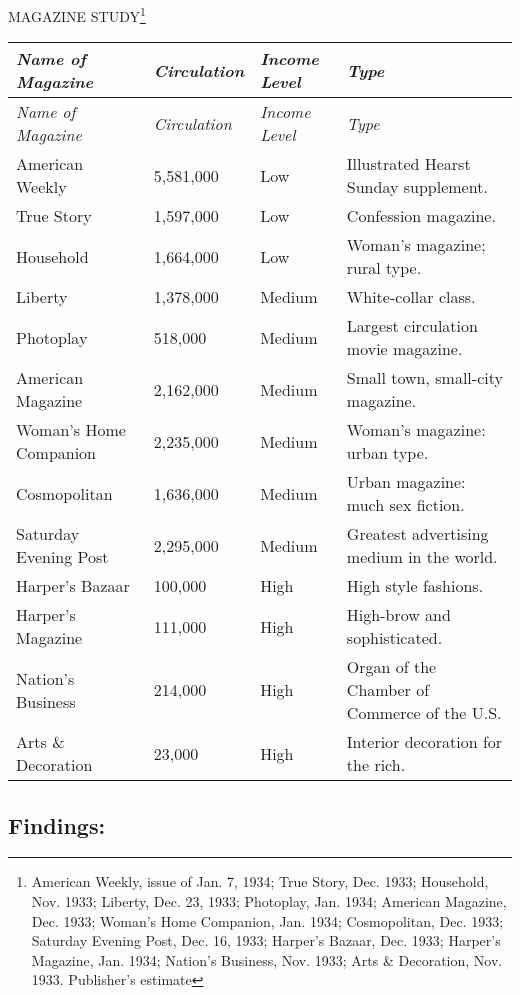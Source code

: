 \documentclass[twoside,nohyper,openany,nobib]{tufte-book}
\begin{document}
\vspace{5mm}

\begin{center}MAGAZINE STUDY\footnote{American Weekly, issue of Jan. 7, 1934; True Story, Dec. 1933;
  Household, Nov. 1933; Liberty, Dec. 23, 1933; Photoplay, Jan. 1934;
  American Magazine, Dec. 1933; Woman's Home Companion, Jan. 1934;
  Cosmopolitan, Dec. 1933; Saturday Evening Post, Dec. 16, 1933;
  Harper's Bazaar, Dec. 1933; Harper's Magazine, Jan. 1934; Nation's
  Business, Nov. 1933; Arts \& Decoration, Nov. 1933. Publisher's estimate}\end{center}
\tabulinesep=1.1mm
{\begin{longtabu} to 1.05\textwidth { X[2,l] X[1,r] X[1,l] X[3,l] } 
\emph{Name of Magazine} & \emph{Circulation} & \emph{Income Level} & \emph{Type} \\ [1.5ex]
\endfirsthead
\emph{Name of Magazine} & \emph{Circulation} & \emph{Income Level} & \emph{Type} \\ [1.5ex]
\endhead
American Weekly & 5,581,000 & Low & Illustrated Hearst Sunday supplement. \\
True Story & 1,597,000 & Low & Confession magazine. \\
Household & 1,664,000 & Low & Woman's magazine; rural type. \\
Liberty & 1,378,000 & Medium & White-collar class. \\
Photoplay & 518,000 & Medium & Largest circulation movie magazine. \\
American Magazine & 2,162,000 & Medium & Small town, small-city magazine. \\
Woman's Home Companion & 2,235,000 & Medium & Woman's magazine: urban type. \\
Cosmopolitan & 1,636,000 & Medium & Urban magazine: much sex fiction. \\
Saturday Evening Post & 2,295,000 & Medium & Greatest advertising medium in the world. \\
Harper's Bazaar & 100,000 & High & High style fashions. \\
Harper's Magazine & 111,000 & High & High-brow and sophisticated. \\
Nation's Business & 214,000 & High & Organ of the Chamber of Commerce of the U.S. \\
Arts \& Decoration & 23,000 & High & Interior decoration for the rich. \\
\end{longtabu}}


\subsection{Findings:}
\end{document}
